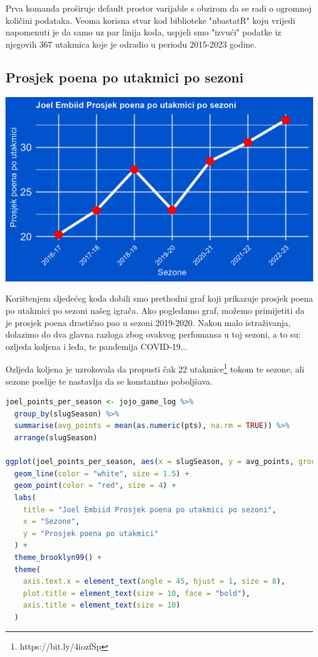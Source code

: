 \documentclass[letterpaper,11pt,leqno]{article}
\begin{document}
Prva komanda proširuje default prostor varijable s obzirom da se radi o ogromnoj količini podataka. Veoma korisna stvar kod biblioteke "nbastatR" koju vrijedi napomenuti je da samo uz par linija koda, uspjeli smo "izvući" podatke iz njegovih 367 utakmica koje je odradio u periodu 2015-2023 godine.


\subsection{Prosjek poena po utakmici po sezoni} 

\begin{center}
    \includegraphics{AveragePoints.png}
\end{center}

Korištenjem sljedećeg koda dobili smo prethodni graf koji prikazuje prosjek poena po utakmici po sezoni našeg igrača. Ako pogledamo graf, možemo primijetiti da je prosjek poena drastično pao u sezoni 2019-2020. Nakon malo istraživanja, dolazimo do dva glavna razloga zbog ovakvog perfomansa u toj sezoni, a to su: ozljeda koljena i leđa, te pandemija COVID-19...

Ozljeda koljena je uzrokovala da propusti čak 22 utakmice\footnote{https://bit.ly/4iozfSp} tokom te sezone, ali sezone poslije te nastavlja da se konstantno poboljšava.

\begin{lstlisting}[language=R]
joel_points_per_season <- jojo_game_log %>%
  group_by(slugSeason) %>%
  summarise(avg_points = mean(as.numeric(pts), na.rm = TRUE)) %>%
  arrange(slugSeason)

ggplot(joel_points_per_season, aes(x = slugSeason, y = avg_points, group = 1)) +
  geom_line(color = "white", size = 1.5) +
  geom_point(color = "red", size = 4) +
  labs(
    title = "Joel Embiid Prosjek poena po utakmici po sezoni",
    x = "Sezone",
    y = "Prosjek poena po utakmici"
  ) +
  theme_brooklyn99() +
  theme(
    axis.text.x = element_text(angle = 45, hjust = 1, size = 8),
    plot.title = element_text(size = 10, face = "bold"),
    axis.title = element_text(size = 10)
  )

\end{lstlisting}
\end{document}
